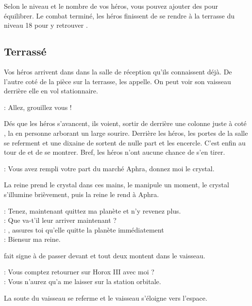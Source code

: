 Selon le niveau et le nombre de vos héros, vous pouvez ajouter des  pour équilibrer.
\bigbreak
Le combat terminé, les héros finissent de se rendre à la terrasse du niveau 18 pour y retrouver .
\newpage

\subsection{Terrassé}

Vos héros arrivent dans dans la salle de réception qu’ils connaissent déjà. De l’autre coté de la pièce sur la terrasse,  les appelle. On peut voir son vaisseau derrière elle en vol stationnaire.

\begin{quotebox}
\noindent\textbf{}: Allez, grouillez vous !
\end{quotebox}

Dés que les héros s’avancent, ils voient, sortir de derrière une colonne juste à coté , la  en personne arborant un large sourire. Derrière les héros, les portes de la salle se referment et une dixaine de  sortent de nulle part et les encercle. C’est enfin au tour de  et  de se montrer. Bref, les héros n’ont aucune chance de s’en tirer.

\begin{quotebox}
\noindent\textbf{}: Vous avez rempli votre part du marché Aphra, donnez moi le crystal.
\end{quotebox}
La reine prend le crystal dans ces mains, le manipule un moment, le crystal s’illumine brièvement, puis la reine le rend à Aphra.
\begin{quotebox}
\noindent\textbf{}: Tenez, maintenant quittez ma planète et n’y revenez plus.\\
\noindent\textbf{}: Que va-t’il leur arriver maintenant ?\\
\noindent\textbf{}: , assures toi qu’elle quitte la planète immédiatement\\
\noindent\textbf{}: Biensur ma reine.
\end{quotebox}
 fait signe à  de passer devant et tout deux montent dans le vaisseau.
\begin{quotebox}
\noindent\textbf{}: Vous comptez retourner sur Horox III avec moi ?\\
\noindent\textbf{}: Vous n’aurez qu’a me laisser sur la station orbitale.
\end{quotebox}
La soute du vaisseau se referme et le vaisseau s’éloigne vers l’espace.

